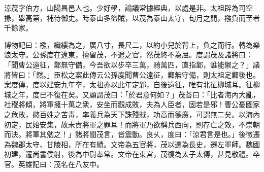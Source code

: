 
\begin{pinyinscope}
涼茂字伯方，山陽昌邑人也。少好學，論議常據經典，以處是非。太祖辟為司空掾，舉高第，補侍御史。時泰山多盜賊，以茂為泰山太守，旬月之閒，襁負而至者千餘家。

博物記曰：襁，織縷為之，廣八寸，長尺二，以約小兒於背上，負之而行。轉為樂浪太守。公孫度在遼東，擅留茂，不遣之官，然茂終不為屈。度謂茂及諸將曰：「聞曹公遠征，鄴無守備，今吾欲以步卒三萬，騎萬匹，直指鄴，誰能禦之？」諸將皆曰：「然。」臣松之案此傳云公孫度聞曹公遠征，鄴無守備，則太祖定鄴後也。案度傳，度以建安九年卒，太祖亦以此年定鄴，自後遠征，唯有北征柳城耳。征柳城之年，度已不復在矣。又顧謂茂曰：「於君意何如？」茂荅曰：「比者海內大亂，社稷將傾，將軍擁十萬之衆，安坐而觀成敗，夫為人臣者，固若是邪！曹公憂國家之危敗，愍百姓之苦毒，率義兵為天下誅殘賊，功高而德廣，可謂無二矣。以海內初定，民始安集，故未責將軍之罪耳！而將軍乃欲稱兵西向，則存亡之效，不崇朝而決。將軍其勉之！」諸將聞茂言，皆震動。良乆，度曰：「涼君言是也。」後徵遷為魏郡太守、甘陵相，所在有績。文帝為五官將，茂以選為長史，遷左軍師。魏國初建，遷尚書僕射，後為中尉奉常。文帝在東宮，茂復為太子太傅，甚見敬禮。卒官。英雄記曰：茂名在八友中。


\end{pinyinscope}